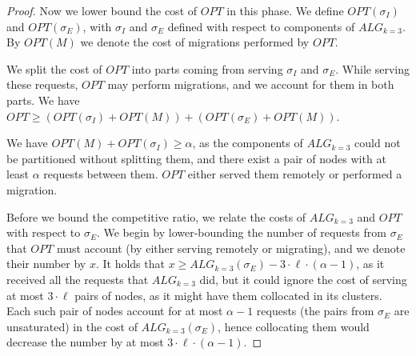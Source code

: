 \documentclass[manuscript,screen=true]{acmart}
\newcommand{\OPT}{\mathit{OPT}}
\newcommand{\TAlg}{{\ensuremath{ALG_{k=3}}}\xspace} %
\begin{document}
\begin{proof}
  \medskip

  Now we lower bound the cost of $\OPT$ in this phase.
  We define $\OPT(\sigma_I)$ and $\OPT(\sigma_E)$, with $\sigma_I$ and $\sigma_E$ defined with respect to components of \TAlg.
  By $\OPT(M)$ we denote the cost of migrations performed by $\OPT$.
  
  We split the cost of $\OPT$ into parts coming from serving $\sigma_I$ and $\sigma_E$.
  While serving these requests, $\OPT$ may perform migrations, and we account for them in both parts.
  We have $\OPT \geq (\OPT(\sigma_I) + \OPT(M)) + (\OPT(\sigma_E) + \OPT(M))$.


  We have $OPT(M) + OPT(\sigma_I) \geq \alpha$, as the components of \TAlg{} could not be partitioned without splitting them, and there exist a pair of nodes with at least $\alpha$ requests between them.
  $\OPT$ either served them remotely or performed a migration.

  \medskip

  Before we bound the competitive ratio, we relate the costs of $\TAlg$ and $\OPT$ with respect to $\sigma_E$.
  We begin by lower-bounding the number of requests from $\sigma_E$ that $\OPT$ must account (by either serving remotely or migrating), and we denote their number by $x$.
  It holds that $x \geq \TAlg(\sigma_E) - 3\cdot\ell\cdot(\alpha - 1)$, as it received all the requests that \TAlg did, but it could ignore the cost of serving at most $3\cdot\ell$ pairs of nodes, as it might have them collocated in its clusters.
  Each such pair of nodes account for at most $\alpha-1$ requests (the pairs from $\sigma_E$ are unsaturated) in the cost of $\TAlg(\sigma_E)$, hence collocating them would decrease the number by at most $3\cdot\ell\cdot(\alpha - 1)$.


\end{proof}
\end{document}
